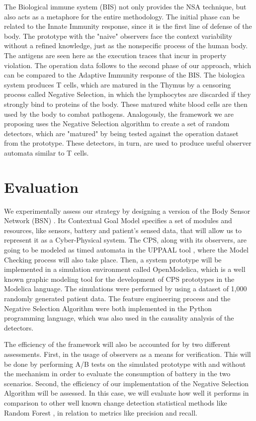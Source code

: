 The Biological immune system (BIS) not only provides the NSA technique, but also acts as a metaphore for the entire methodology. The initial phase can be related to the Innate Immunity response, since it is the first line of defense of the body. The prototype with the "naive" observers face the context variability without a refined knowledge, just as the nonspecific process of the human body. The antigens are seen here as the execution traces that incur in property violation. The operation data follows to the second phase of our approach, which can be compared to the Adaptive Immunity response of the BIS. The biologica system produces T cells, which are matured in the Thymus by a censoring process called Negative Selection, in which the lymphocytes are discarded if they strongly bind to proteins of the body. These matured white blood cells are then used by the body to combat pathogens. Analogously, the framework we are proposing uses the Negative Selection algorithm to create a set of random detectors, which are "matured" by being tested against the operation dataset from the prototype. These detectors, in turn, are used to produce useful observer automata similar to T cells. 

\section{Evaluation}

We experimentally assess our strategy by designing a version of the Body Sensor Network (BSN) \cite{2021BSN}. Its Contextual Goal Model specifies a set of modules and resources, like sensors, battery and patient's sensed data, that will allow us to represent it as a Cyber-Physical system. The CPS, along with its observers, are going to be modeled as timed automata in the UPPAAL tool \cite{UPPAAL}, where the Model Checking process will also take place. Then, a system prototype will be implemented in a simulation environment called OpenModelica, which is a well known graphic modeling tool for the development of CPS prototypes in the Modelica language. %
The simulations were performed by using a dataset of 1,000 randomly generated patient data. The feature engineering process and the Negative Selection Algorithm were both implemented in the Python programming language, which was also used in the causality analysis of the detectors.

The efficiency of the framework will also be accounted for by two different assessments. First, in the usage of observers as a means for verification. This will be done by performing A/B tests on the simulated prototype with and without the mechanism in order to evaluate the consumption of battery in the two scenarios. Second, the efficiency of our implementation of the Negative Selection Algorithm will be assessed. In this case, we will evaluate how well it performs in comparison to other well known change detection statistical methods like Random Forest %
, in relation to metrics like precision and recall.

